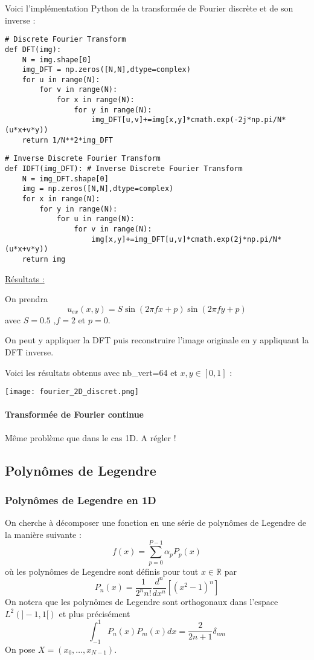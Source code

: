 Voici l'implémentation Python de la transformée de Fourier discrète et de son inverse :

\lstset{style=Python}

\begin{lstlisting}
# Discrete Fourier Transform
def DFT(img):
	N = img.shape[0]
	img_DFT = np.zeros([N,N],dtype=complex)
	for u in range(N):
		for v in range(N):
			for x in range(N):
				for y in range(N):
					img_DFT[u,v]+=img[x,y]*cmath.exp(-2j*np.pi/N*(u*x+v*y))
	return 1/N**2*img_DFT
\end{lstlisting}
\begin{lstlisting}
# Inverse Discrete Fourier Transform
def IDFT(img_DFT): # Inverse Discrete Fourier Transform
	N = img_DFT.shape[0]
	img = np.zeros([N,N],dtype=complex)
	for x in range(N):
		for y in range(N):
			for u in range(N):
				for v in range(N):
					img[x,y]+=img_DFT[u,v]*cmath.exp(2j*np.pi/N*(u*x+v*y))
	return img
\end{lstlisting}

\underline{Résultats :}

On prendra
$$u_{ex}(x,y)=S\sin(2\pi fx + p)\sin(2\pi fy + p)$$
avec $S=0.5$ ,$f=2$ et $p=0$.

On peut y appliquer la DFT puis reconstruire l'image originale en y appliquant la DFT inverse. 

Voici les résultats obtenus avec nb\_vert=64 et $x,y\in[0,1]$ :

\begin{minipage}{\linewidth}
	\centering
	\texttt{[image: fourier\_2D\_discret.png]}
\end{minipage}

\paragraph{Transformée de Fourier continue \\}

Même problème que dans le cas 1D. A régler !

\subsection{Polynômes de Legendre}

\subsubsection{Polynômes de Legendre en 1D}

On cherche à décomposer une fonction en une série de polynômes de Legendre de la manière suivante :
\begin{equation}
	f(x)=\sum_{p=0}^{P-1} \alpha_p P_p(x)
	\label{decomp_1D}
\end{equation}
où les polynômes de Legendre sont définis pour tout $x\in\mathbb{R}$ par
$$P_n(x)=\frac{1}{2^n n!}\frac{d^n}{dx^n}[(x^2-1)^n]$$
On notera que les polynômes de Legendre sont orthogonaux dans l'espace $L^2(]-1,1[)$ et plus précisément
\begin{equation}
	\int_{-1}^1 P_n(x)P_m(x)dx=\frac{2}{2n+1}\delta_{nm} 
	\label{ortho_1D}
\end{equation}
On pose $X=(x_0,\dots,x_{N-1})$.

